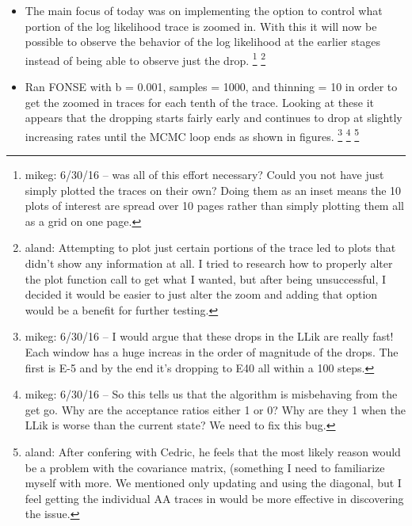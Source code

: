 \documentclass[11pt]{labbook}
\begin{document}
    \begin{itemize}
        \item The main focus of today was on implementing the option to control what portion of the log likelihood trace is zoomed in. With this it will now be possible to observe the behavior of the log likelihood at the earlier stages instead of being able to observe just the drop.
\footnote{mikeg: 6/30/16 -- was all of this effort necessary?
  Could you not have just simply plotted the traces on their own? 
  Doing them as an inset means the 10 plots of interest are spread over 10 pages rather than simply plotting them all as a grid on one page.}
\footnote{aland: Attempting to plot just certain portions of the trace led to plots that didn't show any information at all. I tried to research how to properly alter the plot function call to get what I wanted, but after being unsuccessful, I decided it would be easier to just alter the zoom and adding that option would be a benefit for further testing.}
  
        \item Ran FONSE with b = 0.001, samples = 1000, and thinning = 10 in order to get the zoomed in traces for each tenth of the trace. Looking at these it appears that the dropping starts fairly early and continues to drop at slightly increasing rates until the MCMC loop ends as shown in figures.
\footnote{mikeg: 6/30/16 -- I would argue that these drops in the LLik are really fast! 
  Each window has a huge increas in the order of magnitude of the drops.
  The first is E-5 and by the end it's dropping to E40 all within a 100 steps.
}
\footnote{mikeg: 6/30/16 -- So this tells us that the algorithm is misbehaving from the get go.  
  Why are the acceptance ratios either 1 or 0?
  Why are they 1 when the LLik is worse than the current state?
  We need to fix this bug.
}
\footnote{aland: After confering with Cedric, he feels that the most likely reason would be a problem with the covariance matrix, (something I need to familiarize myself with more. We mentioned only updating and using the diagonal, but I feel getting the individual AA traces in would be more effective in discovering the issue.}
    \end{itemize}
\end{document}
